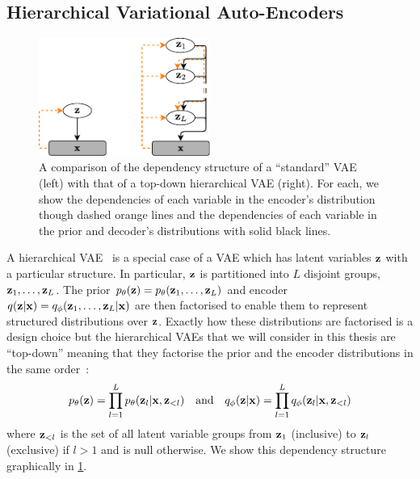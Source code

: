 \subsection{Hierarchical Variational Auto-Encoders}
\label{sec:hierarchical-vae}
\begin{figure}
    \centering
    \includegraphics[width=0.5\textwidth]{figs/thesis/vae-vs-hierarchical-vae.pdf}
    \caption{A comparison of the dependency structure of a ``standard'' VAE (left) with that of a top-down hierarchical VAE (right). For each, we show the dependencies of each variable in the encoder's distribution though dashed orange lines and the dependencies of each variable in the prior and decoder's distributions with solid black lines.}
    \label{fig:vae-vs-hierarchical-vae}
\end{figure}
A hierarchical VAE~\citep{gregor2015draw,kingma2016improving,sonderby2016ladder,klushyn2019learning} is a special case of a VAE which has latent variables ${\mathbf{z}}$ with a particular structure. In particular, ${\mathbf{z}}$ is partitioned into $L$ disjoint groups, ${\mathbf{z}}_1,\ldots,{\mathbf{z}}_L$. The prior $p_\theta({\mathbf{z}}) = p_\theta({\mathbf{z}}_1,\ldots,{\mathbf{z}}_L)$ and encoder $q({\mathbf{z}}|{\mathbf{x}}) = q_\phi({\mathbf{z}}_1,\ldots,{\mathbf{z}}_L|{\mathbf{x}})$ are then factorised to enable them to represent structured distributions over ${\mathbf{z}}$. Exactly how these distributions are factorised is a design choice but the hierarchical VAEs that we will consider in this thesis are ``top-down'' meaning that they factorise the prior and the encoder distributions in the same order~\citep{vahdat2020nvae,child2020very}:
\begin{equation} \label{eq:hierarchical-vae-factorisations}
    p_\theta({\mathbf{z}}) = \prod_{l=1}^L p_\theta({\mathbf{z}}_l|{\mathbf{x}},{\mathbf{z}}_{<l}) \quad \text{and} \quad q_\phi({\mathbf{z}}|{\mathbf{x}}) = \prod_{l=1}^L q_\phi({\mathbf{z}}_l|{\mathbf{x}},{\mathbf{z}}_{<l})
\end{equation}
where ${\mathbf{z}}_{<l}$ is the set of all latent variable groups from ${\mathbf{z}}_1$ (inclusive) to ${\mathbf{z}}_{l}$ (exclusive) if $l > 1$ and is null otherwise. We show this dependency structure graphically in \cref{fig:vae-vs-hierarchical-vae}.

